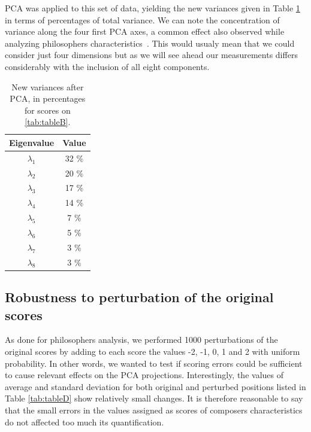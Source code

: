 \documentclass[
 aip,
 jmp,
 amsmath,amssymb,
 reprint,
]{revtex4-1}
\begin{document}
PCA was applied to this set of data, yielding the new variances given
in Table \ref{tab:tableC} in terms of percentages of total variance.
We can note the concentration of variance along the four
first PCA axes, a common effect also observed while analyzing
philosophers characteristics~\cite{Fabbri}. This would usualy mean that we could
consider just four dimensions but as we will see ahead our measurements
differs considerably with the inclusion of all eight components.

\begin{table}[ht]
\caption{\label{tab:tableC}New variances after PCA, in percentages for
  scores on \ref{tab:tableB}.}

\begin{tabular}{|c||c|}
\hline
Eigenvalue  & Value     \\ \hline

$\lambda_1$ &  32 \% \\
$\lambda_2$ &  20 \% \\
$\lambda_3$ &  17 \% \\
$\lambda_4$ &  14 \% \\
$\lambda_5$ &   7 \% \\
$\lambda_6$ &   5 \% \\
$\lambda_7$ &   3 \% \\
$\lambda_8$ &   3 \% \\
\hline

\end{tabular}
\end{table}

\subsection{Robustness to perturbation of the original scores}

As done for philosophers analysis, we performed 1000 perturbations of
the original scores by adding to each score the values -2, -1, 0, 1 and 2 with
uniform probability. In other words, we wanted to test if scoring
errors could be sufficient to cause relevant effects
on the PCA projections. Interestingly, the values of average and
standard deviation for both original and perturbed positions listed in Table
\ref{tab:tableD} show relatively small changes. It is therefore
reasonable to say that the small errors in the values assigned as scores of composers
characteristics do not affected too much its quantification.
\end{document}
